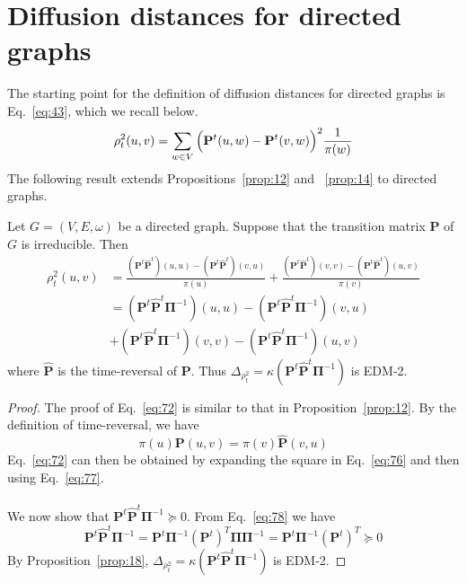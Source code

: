 \section{Diffusion distances for directed graphs}
\label{sec:diff-dist-direct}
The starting point for the definition of diffusion distances for
directed graphs is Eq.~\eqref{eq:43}, which we recall below.
\begin{equation}
  \label{eq:76}
  \rho^{2}_{t}(u,v) = \sum_{w \in V}{\Bigl(\mathbf{P}^{t}(u,w) -
    \mathbf{P}^{t}(v,w)\Bigr)^2 \frac{1}{\pi(w)}}
\end{equation}
The following result extends Propositions~\ref{prop:12} and
~\ref{prop:14} to directed graphs.
\begin{proposition}
  \label{prop:20}
  Let $G = (V,E,\omega)$ be a directed graph. Suppose that
  the transition matrix $\mathbf{P}$ of $G$ is irreducible. Then
  \begin{equation}
    \label{eq:72}
    \begin{split}
      \rho_{t}^{2}(u,v) &= \frac{(\mathbf{P}^{t}\hat{\mathbf{P}}^{t})(u,u) -
        (\mathbf{P}^{t}\hat{\mathbf{P}}^{t})(v,u)}{\pi(u)} +
      \frac{(\mathbf{P}^{t}\hat{\mathbf{P}}^{t})(v,v) -
        (\mathbf{P}^{t}\hat{\mathbf{P}}^{t})(u,v)}{\pi(v)}  \\
      &= (\mathbf{P}^{t}\hat{\mathbf{P}}^{t}\bm{\Pi}^{-1})(u,u) -
      (\mathbf{P}^{t}\hat{\mathbf{P}}^{t}\bm{\Pi}^{-1})(v,u) \\
      &+ (\mathbf{P}^{t}\hat{\mathbf{P}}^{t}\bm{\Pi}^{-1})(v,v) -
      (\mathbf{P}^{t}\hat{\mathbf{P}}^{t}\bm{\Pi}^{-1})(u,v)
    \end{split}
  \end{equation}
  where $\hat{\mathbf{P}}$ is the time-reversal of $\mathbf{P}$.  Thus
  $\Delta_{\rho_{t}^{2}} =
  \kappa(\mathbf{P}^{t}\hat{\mathbf{P}}^{t}\bm{\Pi}^{-1})$ is EDM-2.
\end{proposition}
\begin{proof}
  The proof of Eq.~\eqref{eq:72} is similar to that in
  Proposition~\ref{prop:12}. By the definition of time-reversal, we
  have
  \begin{equation}
    \label{eq:77}
    \pi(u) \mathbf{P}(u,v) = \pi(v) \hat{\mathbf{P}}(v,u)
  \end{equation}
  Eq.~\eqref{eq:72} can then be obtained by expanding the square in
  Eq.~\eqref{eq:76} and then using Eq.~\eqref{eq:77}. \\ \\
  \noindent We now show that
  $\mathbf{P}^{t}\hat{\mathbf{P}}^{t}\bm{\Pi}^{-1} \succeq 0$. From
  Eq.~\eqref{eq:78} we have
  \begin{equation}
    \label{eq:79}
    \mathbf{P}^{t}\hat{\mathbf{P}}^{t}\bm{\Pi}^{-1} = 
    \mathbf{P}^{t}\bm{\Pi}^{-1}(\mathbf{P}^{t})^{T}\bm{\Pi}\bm{\Pi}^{-1}
    = \mathbf{P}^{t}\bm{\Pi}^{-1}(\mathbf{P}^{t})^{T} \succeq 0
  \end{equation}
  By Proposition~\ref{prop:18}, $\Delta_{\rho_{t}^2} =
  \kappa(\mathbf{P}^{t}\hat{\mathbf{P}}^{t}\bm{\Pi}^{-1})$ is EDM-2.
\end{proof}

